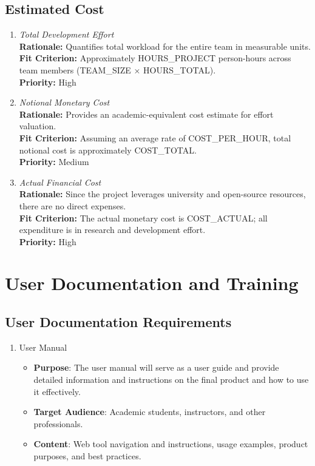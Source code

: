 \documentclass[12pt]{article}
\begin{document}
\subsection{Estimated Cost}
\begin{enumerate}[label=C-EC \arabic*., wide=0pt, leftmargin=*]
\item \emph{Total Development Effort}\\[2mm] 
    {\bf Rationale:} Quantifies total workload for the entire team in measurable units.\\
    {\bf Fit Criterion:} Approximately HOURS\_PROJECT person-hours across team members (TEAM\_SIZE × HOURS\_TOTAL).\\
    {\bf Priority:} High

\item \emph{Notional Monetary Cost}\\[2mm] 
    {\bf Rationale:} Provides an academic-equivalent cost estimate for effort valuation.\\
    {\bf Fit Criterion:} Assuming an average rate of COST\_PER\_HOUR, total notional cost is approximately COST\_TOTAL.\\
    {\bf Priority:} Medium

\item \emph{Actual Financial Cost}\\[2mm] 
    {\bf Rationale:} Since the project leverages university and open-source resources, there are no direct expenses.\\
    {\bf Fit Criterion:} The actual monetary cost is COST\_ACTUAL; all expenditure is in research and development effort.\\
    {\bf Priority:} High
\end{enumerate}
\section{User Documentation and Training}
\subsection{User Documentation Requirements}
\begin{enumerate}
  \item User Manual
    \begin{itemize}
      \item \textbf{Purpose}: The user manual will serve as a user
        guide and provide detailed information and instructions on
        the final product and how to use it effectively.
      \item \textbf{Target Audience}: Academic students, instructors,
        and other professionals.
      \item \textbf{Content}: Web tool navigation and instructions,
        usage examples, product purposes, and best practices.
    \end{itemize}
\end{enumerate}
\end{document}
